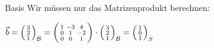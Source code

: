 \begin{example2}{Basis}
    Wir müssen nur das Matrizenprodukt berechnen: 
    
    $\vec{b}=\begin{psmallmatrix}3 \\ 2 \\ 1\end{psmallmatrix}_{\mathcal{B}}=\begin{psmallmatrix}1 & -3 & 4 \\ 0 & 1 & -2 \\ 0 & 0 & 1\end{psmallmatrix} \cdot\begin{psmallmatrix}3 \\ 2 \\ 1\end{psmallmatrix}_{\mathcal{B}}=\begin{psmallmatrix}1 \\ 0 \\ 1\end{psmallmatrix}_{S}$

\end{example2}


